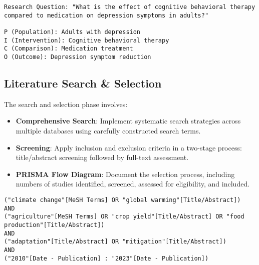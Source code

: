\begin{infobox}
\begin{lstlisting}
Research Question: "What is the effect of cognitive behavioral therapy compared to medication on depression symptoms in adults?"

P (Population): Adults with depression
I (Intervention): Cognitive behavioral therapy
C (Comparison): Medication treatment
O (Outcome): Depression symptom reduction
\end{lstlisting}
\end{infobox}

\subsection{Literature Search \& Selection}

The search and selection phase involves:

\begin{itemize}
    \item \textbf{Comprehensive Search}: Implement systematic search strategies across multiple databases using carefully constructed search terms.
    \item \textbf{Screening}: Apply inclusion and exclusion criteria in a two-stage process: title/abstract screening followed by full-text assessment.
    \item \textbf{PRISMA Flow Diagram}: Document the selection process, including numbers of studies identified, screened, assessed for eligibility, and included.
\end{itemize}

\begin{infobox}
\begin{lstlisting}
("climate change"[MeSH Terms] OR "global warming"[Title/Abstract])
AND
("agriculture"[MeSH Terms] OR "crop yield"[Title/Abstract] OR "food production"[Title/Abstract])
AND
("adaptation"[Title/Abstract] OR "mitigation"[Title/Abstract])
AND
("2010"[Date - Publication] : "2023"[Date - Publication])
\end{lstlisting}
\end{infobox}

